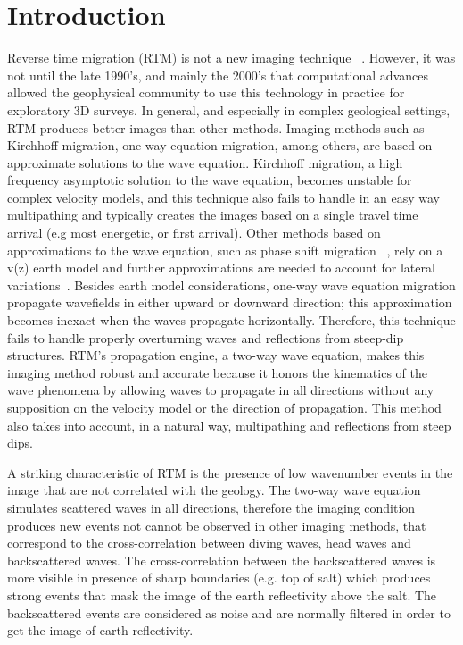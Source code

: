 \section{Introduction}

Reverse time migration (RTM) is not a new imaging technique ~\citep{baysal:1514, whitmore:382, GPR:GPR413}.
However, it was not until the late 1990’s, and mainly the 2000’s that computational
 advances allowed the geophysical community to use this technology in practice for exploratory
3D surveys. In general, and especially in complex geological settings, RTM produces better 
images than other methods. Imaging methods such as Kirchhoff migration, one-way equation
 migration, among others, are based on approximate solutions to the wave equation. Kirchhoff migration,
 a high frequency asymptotic solution to the wave equation, becomes unstable for complex velocity models,
 and this technique also fails to handle in an easy way multipathing and typically creates the images based on a 
single travel time arrival (e.g most energetic, or first arrival). Other methods based on approximations to the wave
 equation, such as phase shift migration ~\citep{gazdag:1342}, rely on a v(z) earth model and further
 approximations are needed to account for lateral variations~\citep{gazdag:124}.
 Besides earth model considerations, one-way wave equation migration propagate wavefields in 
either upward or downward direction; this approximation becomes inexact when the waves 
propagate horizontally. Therefore, this technique fails to handle properly overturning
waves and reflections from steep-dip structures. RTM's propagation engine, a two-way wave equation, 
makes this imaging method robust and accurate because it honors the kinematics of 
the wave phenomena by allowing waves to propagate in all directions without any supposition
on the velocity model or the direction of propagation. This method also takes into account,
 in a natural way, multipathing and  reflections from steep dips.

A striking characteristic of RTM is the presence of low wavenumber events in the image that
 are not correlated with the geology. The two-way wave equation simulates scattered waves in all 
directions, therefore the imaging condition produces new events not cannot be observed in 
other imaging methods, that correspond to the cross-correlation between diving waves, head waves 
and backscattered waves. The cross-correlation between the backscattered waves is more visible in
presence of sharp boundaries (e.g. top of salt) which produces strong events that mask the image of the 
earth reflectivity above the salt. The backscattered events are considered as noise and are normally filtered in order
to get the image of earth reflectivity.

